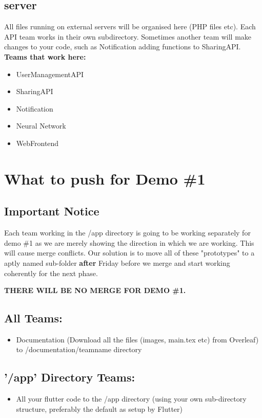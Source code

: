 \documentclass{article}
\begin{document}
\subsection{server}
All files running on external servers will be organised here (PHP files etc). Each API team works in their own subdirectory. Sometimes another team will make changes to your code, such as Notification adding functions to SharingAPI. \\
\newline
\textbf{Teams that work here:}
\begin{itemize}
    \item UserManagementAPI
    \item SharingAPI
    \item Notification
    \item Neural Network
    \item WebFrontend
\end{itemize}

\section{What to push for Demo \#1}
\subsection{Important Notice}
Each team working in the /app directory is going to be working separately for demo \#1 as we are merely showing the direction in which we are working. This will cause merge conflicts. Our solution is to move all of these "prototypes" to a aptly named sub-folder \textbf{after} Friday before we merge and start working coherently for the next phase.

\begin{center}
\textbf{THERE WILL BE NO MERGE FOR DEMO \#1.}
\end{center}

\subsection{All Teams:}
\begin{itemize}
    \item Documentation (Download all the files (images, main.tex etc) from Overleaf) to /documentation/teamname directory
\end{itemize}

\subsection{'/app' Directory Teams:}
\begin{itemize}
    \item All your flutter code to the /app directory (using your own sub-directory structure, preferably the default as setup by Flutter) 
\end{itemize}
\end{document}

